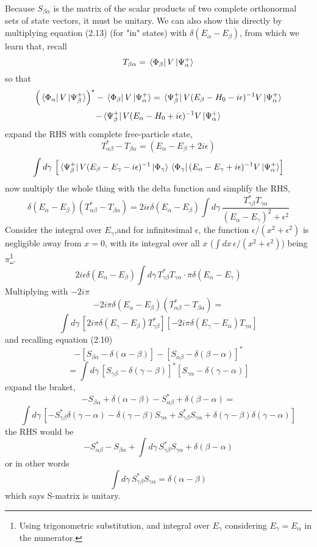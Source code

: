 \documentclass[12pt]{article}
\numberwithin{equation}{section}
\begin{document}
Because $S_{\beta\alpha}$ is the matrix of the scalar products of two complete orthonormal sets of state vectors, it must be unitary.
We can also show this directly by multiplying equation (2.13) (for "in" states) with $\delta(E_{\alpha}-E_{\beta})$, from which we learn that, recall
\[T_{\beta\alpha} = \bra*{\Phi_{\beta}}V\ket*{\Psi_{\alpha}^{+}}\]
so that 
\[\left(\bra*{\Phi_{\alpha}}V\ket*{\Psi_{\beta}^{+}}\right)^{*}-\bra*{\Phi_{\beta}}V\ket*{\Psi_{\alpha}^{+}} = \bra*{\Psi_{\beta}^{+}}V(E_{\beta}-H_0- i\epsilon)^{-1}V\ket*{\Psi_{\alpha}^{+}}\]
\[-\bra*{\Psi_{\beta}^{+}}V(E_{\alpha}-H_0+i\epsilon)^{-1}V\ket*{\Psi_{\alpha}^{+}}\]
expand the RHS with complete free-particle state,
\[T^{*}_{\alpha\beta}-T_{\beta\alpha} = (E_{\alpha}-E_{\beta}+2i\epsilon)\]\[\int{d\gamma\,\left[\bra*{\Psi^{+}_{\beta}}V(E_{\beta}-E_{\gamma}-i\epsilon)^{-1}\ket*{\Phi_{\gamma}}\bra*{\Phi_{\gamma}}(E_{\alpha}-E_{\gamma}+i\epsilon)^{-1}V\ket*{\Psi_{\alpha}^{+}}\right]}\]
now multiply the whole thing with the delta function and simplify the RHS,
\[\delta(E_{\alpha}-E_{\beta})\left(T_{\alpha\beta}^{*}-T_{\beta\alpha}\right)=2i\epsilon\delta(E_{\alpha}-E_{\beta})\int{d\gamma\,\frac{T_{\gamma\beta}^{*}T_{\gamma\alpha}}{(E_{\alpha}-E_{\gamma})^2+\epsilon^2}}\]
Consider the integral over $E_{\gamma}$,and for infinitesimal $\epsilon$, the function $\epsilon/(x^2+\epsilon^2)$ is negligible away from $x=0$, with its integral over all $x$ ($\int{dx\,\epsilon/(x^2+\epsilon^2)}$) being $\pi$\footnote{Using trigonometric substitution, and integral over $E_{\gamma}$ considering $E_{\gamma}=E_{\alpha}$ in the numerator.}.
\[2i\epsilon\delta(E_{\alpha}-E_{\beta})\int{d\gamma\,T_{\gamma\beta}^{*}T_{\gamma\alpha}\cdot\pi\delta(E_{\alpha}-E_{\gamma})}\]
Multiplying with $-2i\pi$
\[-2i\pi\delta(E_{\alpha}-E_{\beta})(T^{*}_{\alpha\beta}-T_{\beta\alpha})=\]
\[\int{d\gamma\,\left[2i\pi\delta(E_{\gamma}-E_{\beta})T_{\gamma\beta}^{*}\right]\left[-2i\pi\delta(E_{\gamma}-E_{\alpha})T_{\gamma\alpha}\right]}\]
and recalling equation (2.10)
\[
    -\left[S_{\beta\alpha}-\delta(\alpha-\beta)\right]-\left[S_{\alpha\beta}-\delta(\beta-\alpha)\right]^{*}
\]
\begin{equation}
    =\int{d\gamma\,\left[S_{\gamma\beta}-\delta(\gamma-\beta)\right]^{*}\left[S_{\gamma\alpha}-\delta(\gamma-\alpha)\right]}
\end{equation}
expand the braket,
\[-S_{\beta\alpha}+\delta(\alpha-\beta)-S_{\alpha\beta}^{*}+\delta(\beta-\alpha)=\]
\[\int{d\gamma\,\left[-S_{\gamma\beta}^{*}\delta(\gamma-\alpha)-\delta(\gamma-\beta)S_{\gamma\alpha}+S_{\gamma\beta}^{*}S_{\gamma\alpha}+\delta(\gamma-\beta)\delta(\gamma-\alpha)\right]}\]
the RHS would be
\[-S_{\alpha\beta}^{*}-S_{\beta\alpha}+\int{d\gamma\,S_{\gamma\beta}^{*}S_{\gamma\alpha}}+\delta(\beta-\alpha)\]
or in other words
\begin{equation}
    \int{d\gamma\,S_{\gamma\beta}^{*}S_{\gamma\alpha}} = \delta(\alpha-\beta)
\end{equation}
which says S-matrix is unitary.
\end{document}
